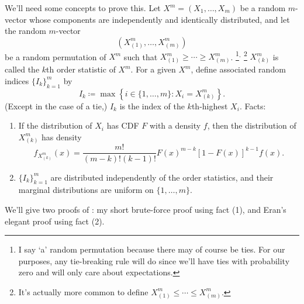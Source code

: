 \documentclass[11pt,letterpaper,reqno,oneside]{article}
\begin{document}
We'll need some concepts to prove this. Let $X^m = (X_1,\dots,X_m)$ be a random $m$-vector whose components are independently and identically distributed, and let the random $m$-vector
%
\begin{equation*}
	\left(X^m_{(1)},\dots,X^m_{(m)}\right) 
\end{equation*}
%
be a random permutation of $X^m$ such that $X^m_{(1)} \geq \cdots \geq X^m_{(m)}$.%
	\footnote{I say `a' random permutation because there may of course be ties. For our purposes, any tie-breaking rule will do since we'll have ties with probability zero and will only care about expectations.}$^,$%
	\footnote{It's actually more common to define $X^m_{(1)} \leq \cdots \leq X^m_{(m)}$.}
$X^m_{(k)}$ is called the $k$th order statistic of $X^m$. For a given $X^m$, define associated random indices $\{ I_k \}_{k=1}^m$ by
%
\begin{equation*}
	I_k \coloneqq \max\left\{ i \in \{1,\dots,m\} : X_i = X^m_{(k)} \right\} .
\end{equation*}
%
(Except in the case of a tie,) $I_k$ is the index of the $k$th-highest $X_i$. Facts:

\begin{enumerate}

	\item If the distribution of $X_i$ has CDF $F$ with a density $f$, then the distribution of $X^m_{(k)}$ has density
	\begin{equation*}
		f_{X^m_{(k)}}(x) 
		= \frac{ m! }{ (m-k)! (k-1)! }
		F(x)^{m-k} \left[ 1 - F(x) \right]^{k-1} f(x) .
	\end{equation*}

	\item  $\{ I_k \}_{k=1}^m$ are distributed independently of the order statistics, and their marginal distributions are uniform on $\{1,\dots,m\}$.

\end{enumerate}
%
We'll give two proofs of : my short brute-force proof using fact (1), and Eran's elegant proof using fact (2).
\end{document}

